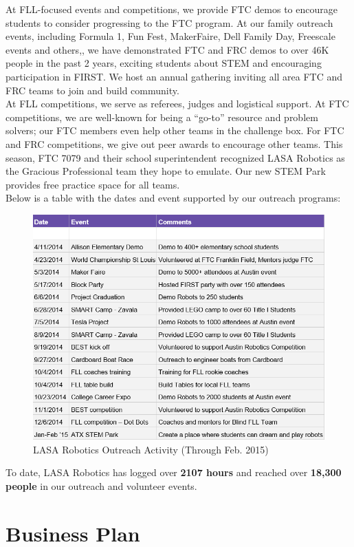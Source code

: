 At FLL-focused events and competitions, we provide FTC demos to encourage students to consider progressing to the FTC program. At our family outreach events, including Formula 1, Fun Fest, MakerFaire, Dell Family Day, Freescale events and others,, we have demonstrated  FTC and FRC demos to over 46K people in the past 2 years, exciting students about STEM and encouraging participation in FIRST. We host an annual gathering inviting all area FTC and FRC teams to join and build community.\\

At FLL competitions, we serve as referees, judges and logistical support. At FTC competitions, we are well-known for being a “go-to” resource and problem solvers; our FTC members even help other teams in the challenge box. For FTC and FRC competitions, we give out peer awards to encourage other teams. This season, FTC 7079 and their school superintendent recognized LASA Robotics as the Gracious Professional team they hope to emulate. Our new STEM Park provides free practice space for all teams.\\

Below is a table with the dates and event supported by our outreach programs:

\begin{figure}[H]
	\centering
	\includegraphics[height=0.6\linewidth]{outreach}
	\caption[]{LASA Robotics Outreach Activity (Through Feb. 2015)}
	\label{fig:reach}
\end{figure}

To date, LASA Robotics has logged over {\bf 2107 hours} and reached over {\bf 18,300 people} in our outreach and volunteer events.

\section{Business Plan}

